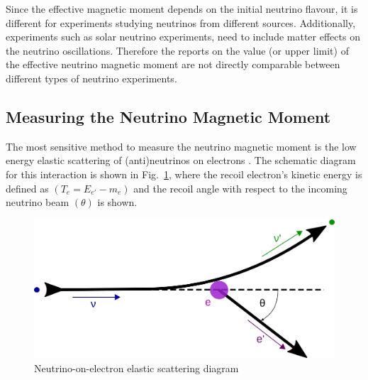 Since the effective magnetic moment depends on the initial neutrino flavour, it is different for experiments studying neutrinos from different sources. Additionally, experiments such as solar neutrino experiments, need to include matter effects on the neutrino oscillations. Therefore the reports on the value (or upper limit) of the effective neutrino magnetic moment are not directly comparable between different types of neutrino experiments.


\subsection{Measuring the Neutrino Magnetic Moment}\label{sec:MeasuringNuMM}
The most sensitive method to measure the neutrino magnetic moment is the low energy elastic scattering of (anti)neutrinos on electrons \cite{nuElmagInt2015.pdf}. The schematic diagram for this interaction is shown in Fig.~\ref{fig:NuoneDiagram}, where the recoil electron's kinetic energy is defined as $\left(T_e=E_{e\prime}-m_e\right)$ and the recoil angle with respect to the incoming neutrino beam $\left(\theta\right)$ is shown.
\begin{figure}[hbtp]
\centering
\includegraphics[width=0.55\linewidth]{Plots/NuMM/NuoneInteraction.png}
\caption{Neutrino-on-electron elastic scattering diagram}
\label{fig:NuoneDiagram}
\end{figure}


